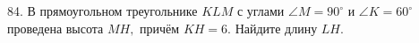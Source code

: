 84. В прямоугольном треугольнике $KLM$ с углами $\angle M=90^\circ$ и $\angle K=60^\circ$ проведена высота $MH,$ причём $KH=6.$ Найдите длину $LH.$\\
